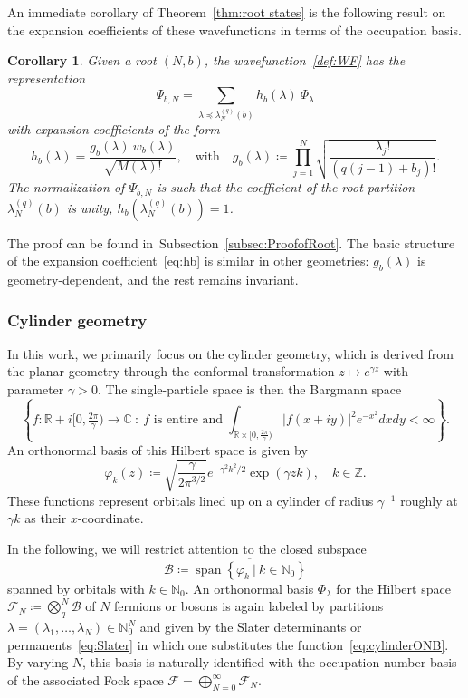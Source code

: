 \documentclass[letterpaper, DIV=17]{scrartcl}
\newtheorem{cor}[theorem]{Corollary}
\numberwithin{equation}{section}
\theoremstyle{definition}
\DeclareMathOperator{\spa}{span}
\begin{document}
An immediate corollary of Theorem~\ref{thm:root states} is the following result on the expansion coefficients of these wavefunctions in terms of the occupation basis.
\begin{cor}\label{cor:planar}
Given a root $(N,b) $, the wavefunction~\eqref{def:WF} has the representation
$$ \Psi_{b,N} =  \sum_{ \lambda \preceq \lambda^{(q)}_N(b)  } h_b (\lambda) \ \Phi_\lambda  $$ with expansion coefficients of the form
\begin{equation} \label{eq:hb}
h_b(\lambda) = \frac{g_b(\lambda) \ w_b(\lambda)}{\sqrt{M(\lambda)!}}   , \quad \mbox{with}\quad g_b(\lambda) \coloneqq  \prod_{j=1}^N\sqrt{ \frac{\lambda_j!}{(q(j-1)+b_j)!}} .
\end{equation}
The normalization of $  \Psi_{b,N} $ is such that the coefficient of the root partition $  \lambda^{(q)}_N(b) $ is unity, $ h_b\left(  \lambda^{(q)}_N(b) \right) = 1 $.
\end{cor}
The proof can be found in~Subsection~\ref{subsec:ProofofRoot}. 
The basic structure of the expansion coefficient~\eqref{eq:hb} is similar in other geometries:  $ g_b(\lambda) $ is geometry-dependent, and the rest remains invariant. 

\subsubsection{Cylinder geometry}


In this work, we primarily focus on the cylinder geometry, which is derived from the planar geometry through the conformal transformation $ z \mapsto e^{\gamma z} $ with parameter $ \gamma > 0 $. The single-particle space is then the Bargmann space
$$
 \left\{ f: \mathbb{R} + i \big[0,\tfrac{2\pi}{\gamma}\big)  \to \mathbb{C} \ : \ \mbox{$f $ is entire and} \; \int_{ \mathbb{R}\times\big[0,\tfrac{2\pi}{\gamma}\big) }  |f(x+iy)|^2 e^{- x^2} dx dy < \infty \right\} . 
$$
An orthonormal basis of this Hilbert space is given by
\begin{equation}\label{eq:cylinderONB}
	 \varphi_k(z) \coloneqq \sqrt{\frac{\gamma }{2\pi^{3/2}}} e^{- \gamma^2 k^2/2} \exp\left( \gamma z k \right) , \quad k \in \mathbb{Z} .
\end{equation}
These functions represent orbitals lined up on a cylinder of radius $ \gamma^{-1} $ roughly at $\gamma k $ as their $ x $-coordinate. 

In the following, we will restrict attention to the closed subspace 
$$ \mathcal{B} \coloneqq \overline{\spa\left\{  \varphi_k  \ | \ k \in \mathbb{N}_0\right\}} $$ 
spanned by orbitals with $ k \in \mathbb{N}_0 $. 
An orthonormal basis $ \Phi_{\lambda} $ for the Hilbert space $ \mathcal{F}_N \coloneqq \bigotimes_{q}^N \mathcal{B}$ of $ N $ fermions or bosons is again labeled by partitions $ \lambda = (\lambda_1, \dots , \lambda_N) \in \mathbb{N}_0^N $ and given by 
the Slater determinants or permanents~\eqref{eq:Slater} in which one substitutes the function~\eqref{eq:cylinderONB}. 
By varying $ N $, this basis is naturally identified with the occupation number basis of the associated Fock space $ \mathcal{F}= \bigoplus_{N=0}^\infty  \mathcal{F}_N $. 
\end{document}

